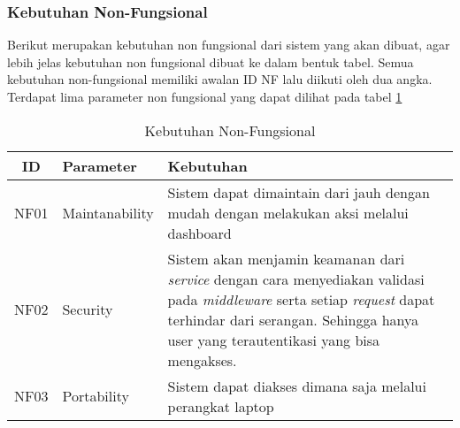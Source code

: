 \subsubsection{Kebutuhan Non-Fungsional}
Berikut merupakan kebutuhan non fungsional dari sistem yang akan dibuat, agar lebih jelas kebutuhan non fungsional dibuat ke dalam bentuk tabel. Semua kebutuhan non-fungsional memiliki awalan ID NF lalu diikuti oleh dua angka. Terdapat lima parameter non fungsional yang dapat dilihat pada tabel \ref{tab:kebutuhan-non-fungsional}

\bgroup
\begin{table}[ht]
  \def\arraystretch{1.7}
  \caption{Kebutuhan Non-Fungsional}
  \label{tab:kebutuhan-non-fungsional}
  \centering
  \begin{tabular}{|c|p{3cm}|p{8cm}|}
    \hline
    ID   & Parameter      & Kebutuhan                                                                                                                                                                                                                               \\
    \hline
    NF01 & Maintanability & Sistem dapat dimaintain dari jauh dengan mudah dengan melakukan aksi melalui dashboard                                                                                                                                                  \\
    \hline
    NF02 & Security       & Sistem akan menjamin keamanan dari \textit{service} dengan cara menyediakan validasi pada \textit{middleware} serta setiap \textit{request} dapat terhindar dari serangan. Sehingga hanya user yang terautentikasi yang bisa mengakses. \\
    \hline
    NF03 & Portability    & Sistem dapat diakses dimana saja melalui perangkat laptop                                                                                                                                                                               \\
    \hline
  \end{tabular}
\end{table}
\egroup